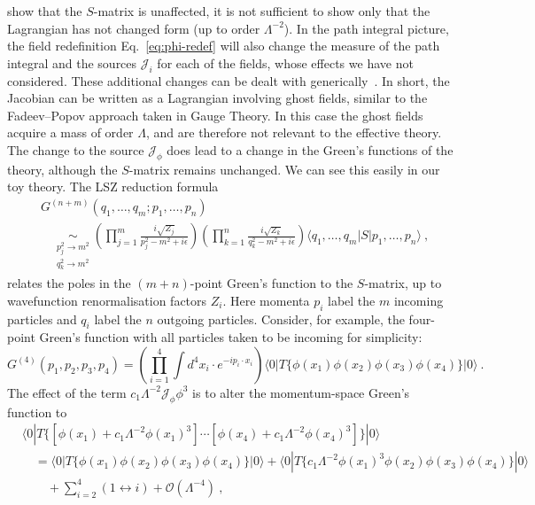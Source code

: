 show that the $S$-matrix is unaffected, it is not sufficient to show only that
the Lagrangian has not changed form (up to order $\Lambda^{-2}$). In the path
integral picture, the field redefinition Eq.~\eqref{eq:phi-redef} will also
change the measure of the path integral and the sources $\mathcal{J}_{i}$ for
each of the fields, whose effects we have not considered. These additional
changes can be dealt with generically~\cite{Arzt:1993gz}. In short, the Jacobian
can be written as a Lagrangian involving ghost fields, similar to the
Fadeev--Popov approach taken in Gauge Theory. In this case the ghost fields
acquire a mass of order $\Lambda$, and are therefore not relevant to the
effective theory. The change to the source $\mathcal{J}_{\phi}$ does lead to a
change in the Green's functions of the theory, although the $S$-matrix remains
unchanged. We can see this easily in our toy theory. The LSZ reduction
formula~\cite{Lehmann:1954rq}
\begin{equation}
  \begin{aligned}
    &G^{(n+m)}(q_{1}, \ldots, q_{m}; p_{1}, \ldots, p_{n}) \\
    &\quad \underset{\substack{p_{j}^{2} \to m^{2}\\q_{k}^{2} \to m^{2}}}{\sim} \left(\prod_{j=1}^{m} \frac{i \sqrt{Z_{j}}}{p_{j}^{2} - m^{2} + i\epsilon}\right) \left(\prod_{k=1}^{n} \frac{i \sqrt{Z_{k}}}{q_{k}^{2} - m^{2} + i \epsilon}\right) \langle q_{1}, \ldots, q_{m} | S | p_{1}, \ldots, p_{n} \rangle \ ,
  \end{aligned}
\end{equation}
relates the poles in the $(m+n)$-point Green's function to the $S$-matrix, up to
wavefunction renormalisation factors $Z_{i}$. Here momenta $p_{i}$
label the $m$ incoming particles and $q_{i}$ label the $n$ outgoing particles.
Consider, for example, the four-point Green's function with all particles taken
to be incoming for simplicity:
\begin{equation}
  \label{eq:5}
  G^{(4)} (p_{1}, p_{2}, p_{3}, p_{4}) = \left( \prod_{i=1}^{4} \int d^{4}x_{i} \cdot e^{-i p_{i} \cdot x_{i}} \right) \langle 0 | T \{ \phi(x_{1}) \phi(x_{2}) \phi(x_{3}) \phi(x_{4}) \} | 0 \rangle \ .
\end{equation}
The effect of the term $c_{1} \Lambda^{-2} \mathcal{J}_{\phi} \phi^{3}$ is to
alter the momentum-space Green's function to
\begin{equation}
  \begin{aligned}
    &\langle 0 | T \{ [\phi(x_{1}) + c_{1}\Lambda^{-2}\phi(x_{1})^{3}] \cdots [\phi(x_{4}) + c_{1}\Lambda^{-2}\phi(x_{4})^{3}] \} | 0 \rangle \\
    &\quad = \langle 0 | T \{ \phi(x_{1}) \phi(x_{2}) \phi(x_{3}) \phi(x_{4}) \} | 0 \rangle + \langle 0 | T \{ c_{1} \Lambda^{-2} \phi(x_{1})^{3} \phi(x_{2}) \phi(x_{3}) \phi(x_{4}) \} | 0 \rangle \\
    &\qquad + \sum_{i=2}^{4} (1 \leftrightarrow i) + \mathcal{O}(\Lambda^{-4}) \ ,
  \end{aligned}
\end{equation}
